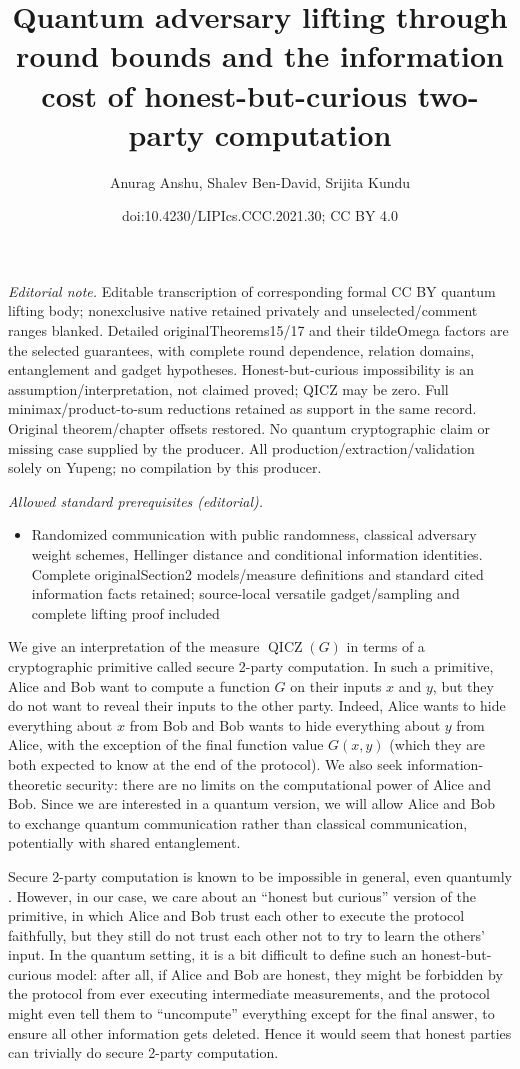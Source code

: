 \documentclass[10pt,a4paper]{article}
\title{Quantum adversary lifting through round bounds and the information cost of honest-but-curious two-party computation}
\author{Anurag Anshu, Shalev Ben-David, Srijita Kundu}
\date{doi:10.4230/LIPIcs.CCC.2021.30; CC BY 4.0}
\theoremstyle{definition}
\renewcommand{\>}{\rangle}
\newcommand{\<}{\langle}
\DeclareMathOperator{\QICZ}{QICZ}
\begin{document}
\maketitle
\noindent\textit{Editorial note.} Editable transcription of corresponding formal CC BY quantum lifting body; nonexclusive native retained privately and unselected/comment ranges blanked. Detailed originalTheorems15/17 and their tildeOmega factors are the selected guarantees, with complete round dependence, relation domains, entanglement and gadget hypotheses. Honest-but-curious impossibility is an assumption/interpretation, not claimed proved; QICZ may be zero. Full minimax/product-to-sum reductions retained as support in the same record. Original theorem/chapter offsets restored. No quantum cryptographic claim or missing case supplied by the producer. All production/extraction/validation solely on Yupeng; no compilation by this producer.\par\medskip
\noindent\textit{Allowed standard prerequisites (editorial).}\begin{itemize}
\item Randomized communication with public randomness, classical adversary weight schemes, Hellinger distance and conditional information identities. Complete originalSection2 models/measure definitions and standard cited information facts retained; source-local versatile gadget/sampling and complete lifting proof included
\end{itemize}\medskip
\setcounter{theorem}{5}We give an interpretation of the measure $\QICZ(G)$ in terms
of a cryptographic primitive called secure 2-party computation.
In such a primitive, Alice and Bob want to compute a function
$G$ on their inputs $x$ and $y$,
but they do not want to reveal their
inputs to the other party. Indeed, Alice wants to hide
everything about $x$ from Bob and Bob wants to hide
everything about $y$ from Alice, with the exception
of the final function value $G(x,y)$ (which they are
both expected to know at the end of the protocol).
We also seek information-theoretic security:
there are no limits on the computational power of Alice and Bob.
Since we are interested in a quantum version, we will
allow Alice and Bob to exchange quantum communication rather
than classical communication, potentially with shared entanglement.

Secure 2-party computation is known to be impossible
in general, even quantumly \cite{Lo97,Col07,BCS12,FKS+13,SSS14}.
However, in our case, we care about an ``honest but curious'' version
of the primitive, in which Alice and Bob trust each other to
execute the protocol faithfully, but they still do not
trust each other not to try to learn the others' input.
In the quantum setting, it is a bit difficult to define such
an honest-but-curious model: after all, if Alice and Bob
are honest, they might be forbidden by the protocol from
ever executing intermediate measurements, and the protocol
might even tell them to ``uncompute'' everything except
for the final answer, to ensure all other information
gets deleted. Hence it would seem that honest parties can trivially
do secure 2-party computation.
\end{document}
